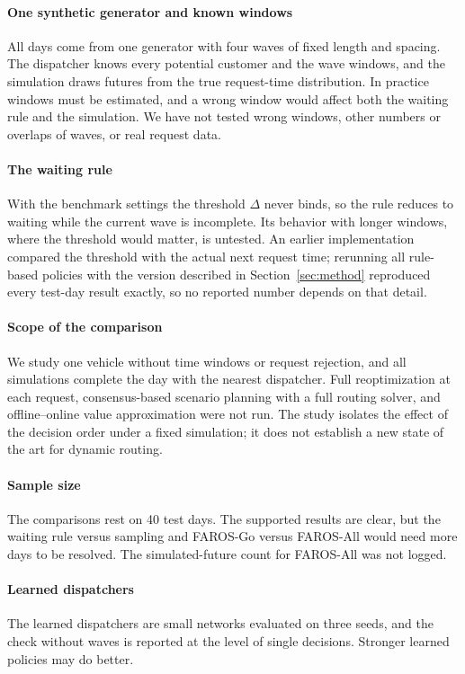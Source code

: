 \documentclass[5p,times,authoryear]{elsarticle}
\begin{document}
\paragraph{One synthetic generator and known windows}
All days come from one generator with four waves of fixed length and spacing. The dispatcher knows every potential customer and the wave windows, and the simulation draws futures from the true request-time distribution. In practice windows must be estimated, and a wrong window would affect both the waiting rule and the simulation. We have not tested wrong windows, other numbers or overlaps of waves, or real request data.

\paragraph{The waiting rule}
With the benchmark settings the threshold $\Delta$ never binds, so the rule reduces to waiting while the current wave is incomplete. Its behavior with longer windows, where the threshold would matter, is untested. An earlier implementation compared the threshold with the actual next request time; rerunning all rule-based policies with the version described in Section~\ref{sec:method} reproduced every test-day result exactly, so no reported number depends on that detail.

\paragraph{Scope of the comparison}
We study one vehicle without time windows or request rejection, and all simulations complete the day with the nearest dispatcher. Full reoptimization at each request, consensus-based scenario planning with a full routing solver, and offline--online value approximation were not run. The study isolates the effect of the decision order under a fixed simulation; it does not establish a new state of the art for dynamic routing.

\paragraph{Sample size}
The comparisons rest on 40 test days. The supported results are clear, but the waiting rule versus sampling and FAROS-Go versus FAROS-All would need more days to be resolved. The simulated-future count for FAROS-All was not logged.

\paragraph{Learned dispatchers}
The learned dispatchers are small networks evaluated on three seeds, and the check without waves is reported at the level of single decisions. Stronger learned policies may do better.
\end{document}
